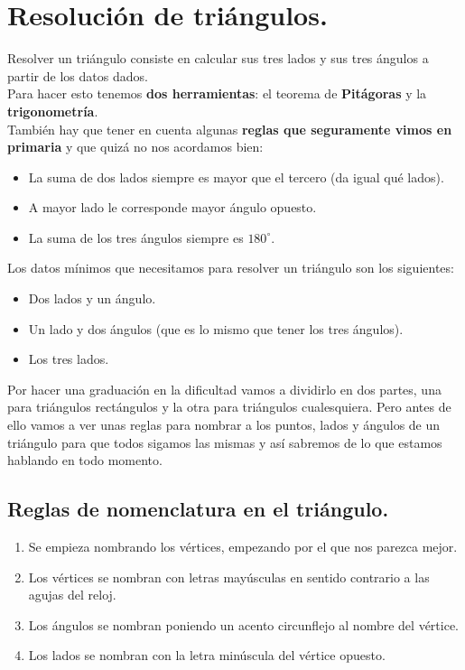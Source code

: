 \documentclass[a4paper,11pt,answers]{exam}
\newcommand{\degree}{^\circ}
\begin{document}
\section{Resolución de triángulos.} \label{resolucion_triangulos}
Resolver un triángulo consiste en calcular sus tres lados y sus tres ángulos a partir de los datos dados.\\
Para hacer esto tenemos \textbf{dos herramientas}: el teorema de \textbf{Pitágoras} y
la \textbf{trigonometría}.\\
También hay que tener en cuenta algunas \textbf{reglas que seguramente vimos en primaria} y que quizá no nos
acordamos bien:
\begin{itemize}
\item La suma de dos lados siempre es mayor que el tercero (da igual qué lados).
\item A mayor lado le corresponde mayor ángulo opuesto.
\item La suma de los tres ángulos siempre es $180\degree$.
\end{itemize}

Los datos mínimos que necesitamos para resolver un triángulo son los siguientes:
\begin{itemize}
\item Dos lados y un ángulo.
\item Un lado y dos ángulos (que es lo mismo que tener los tres ángulos).
\item Los tres lados.
\end{itemize}

Por hacer una graduación en la dificultad vamos a dividirlo en dos partes, una para triángulos rectángulos y la otra para triángulos cualesquiera. Pero antes de ello vamos a ver unas reglas para
nombrar a los puntos, lados y ángulos de un triángulo para que todos sigamos las mismas y así
sabremos de lo que estamos hablando en todo momento.
\subsection{Reglas de nomenclatura en el triángulo.} \label{nomenclatura_triangulo}
\begin{enumerate}
\item Se empieza nombrando los vértices, empezando por el que nos parezca mejor.
\item Los vértices se nombran con letras mayúsculas en sentido contrario a las agujas del reloj.
\item Los ángulos se nombran poniendo un acento circunflejo al nombre del vértice.
\item Los lados se nombran con la letra minúscula del vértice opuesto.
\end{enumerate}
\end{document}
